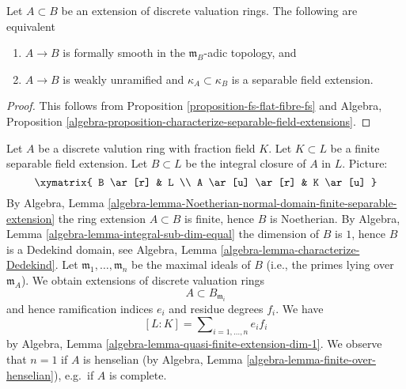 \begin{lemma}
\label{lemma-extension-dvrs-formally-smooth}
Let $A \subset B$ be an extension of discrete valuation rings.
The following are equivalent
\begin{enumerate}
\item $A \to B$ is formally smooth in the $\mathfrak m_B$-adic topology, and
\item $A \to B$ is weakly unramified and $\kappa_A \subset \kappa_B$
is a separable field extension.
\end{enumerate}
\end{lemma}

\begin{proof}
This follows from Proposition \ref{proposition-fs-flat-fibre-fs} and
Algebra, Proposition
\ref{algebra-proposition-characterize-separable-field-extensions}.
\end{proof}

\begin{remark}
\label{remark-finite-separable-extension}
Let $A$ be a discrete valution ring with fraction field $K$.
Let $K \subset L$ be a finite separable field extension.
Let $B \subset L$ be the integral closure of $A$ in $L$.
Picture:
$$
\xymatrix{
B \ar[r] & L \\
A \ar[u] \ar[r] & K \ar[u]
}
$$
By Algebra, Lemma
\ref{algebra-lemma-Noetherian-normal-domain-finite-separable-extension}
the ring extension $A \subset B$ is finite, hence $B$ is Noetherian.
By Algebra, Lemma \ref{algebra-lemma-integral-sub-dim-equal}
the dimension of $B$ is $1$, hence $B$ is a Dedekind domain, see
Algebra, Lemma \ref{algebra-lemma-characterize-Dedekind}.
Let $\mathfrak m_1, \ldots, \mathfrak m_n$ be the maximal ideals
of $B$ (i.e., the primes lying over $\mathfrak m_A$). We obtain
extensions of discrete valuation rings
$$
A \subset B_{\mathfrak m_i}
$$
and hence ramification indices $e_i$ and residue degrees $f_i$. We have
$$
[L : K] = \sum\nolimits_{i = 1, \ldots, n} e_i f_i
$$
by Algebra, Lemma \ref{algebra-lemma-quasi-finite-extension-dim-1}.
We observe that $n = 1$ if $A$ is henselian (by
Algebra, Lemma \ref{algebra-lemma-finite-over-henselian}), e.g.\ if
$A$ is complete.
\end{remark}

